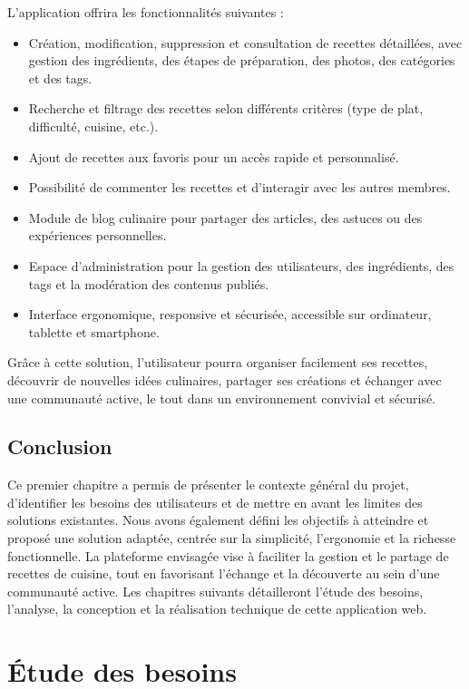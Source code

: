 \documentclass[12pt,a4paper]{report}
\begin{document}
L’application offrira les fonctionnalités suivantes :
\begin{itemize}[label=•]
    \item Création, modification, suppression et consultation de recettes détaillées, avec gestion des ingrédients, des étapes de préparation, des photos, des catégories et des tags.
    \item Recherche et filtrage des recettes selon différents critères (type de plat, difficulté, cuisine, etc.).
    \item Ajout de recettes aux favoris pour un accès rapide et personnalisé.
    \item Possibilité de commenter les recettes et d’interagir avec les autres membres.
    \item Module de blog culinaire pour partager des articles, des astuces ou des expériences personnelles.
    \item Espace d’administration pour la gestion des utilisateurs, des ingrédients, des tags et la modération des contenus publiés.
    \item Interface ergonomique, responsive et sécurisée, accessible sur ordinateur, tablette et smartphone.
\end{itemize}

Grâce à cette solution, l’utilisateur pourra organiser facilement ses recettes, découvrir de nouvelles idées culinaires, partager ses créations et échanger avec une communauté active, le tout dans un environnement convivial et sécurisé.
\section*{Conclusion}

Ce premier chapitre a permis de présenter le contexte général du projet, d’identifier les besoins des utilisateurs et de mettre en avant les limites des solutions existantes. Nous avons également défini les objectifs à atteindre et proposé une solution adaptée, centrée sur la simplicité, l’ergonomie et la richesse fonctionnelle. La plateforme envisagée vise à faciliter la gestion et le partage de recettes de cuisine, tout en favorisant l’échange et la découverte au sein d’une communauté active. Les chapitres suivants détailleront l’étude des besoins, l’analyse, la conception et la réalisation technique de cette application web.

\chapter{Étude des besoins}
\end{document}
